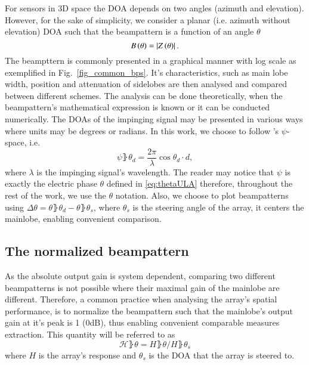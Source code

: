 For sensors in 3D space the DOA depends on two angles (azimuth and elevation).
However, for the sake of simplicity, we consider a planar (i.e. azimuth without elevation) DOA such that the beampattern is a function of an angle $\theta$
\begin{equation}
B\left({\theta}\right) = \left\vert Z\left({\theta}\right)\right\vert.
\end{equation}
The beampttern is commonly presented in a graphical manner with log scale as exemplified in Fig.~\ref{fig_common_bps}.
It's characteristics, such as main lobe width, position and attenuation of sidelobes are then analysed and compared between different schemes.
The analysis can be done theoretically, when the beampattern's mathematical expression is known or it can be conducted numerically.
The DOAs of the impinging signal may be presented in various ways where units may be degrees or radians.
In this work, we choose to follow \cite{van2004optimum}'s $\psi$-space, i.e.
\begin{equation}
    \psi\rBrace{\theta_{d}}=\frac{2\pi}{\lambda}\cos{\theta_{d}}\cdot{}d,
\end{equation}
where $\lambda$ is the impinging signal's wavelength.
The reader may notice that $\psi$ is exactly the electric phase $\theta$ defined in \eqref{eq:thetaULA} therefore, throughout the rest of the work, we use the $\theta$ notation. 
Also, we choose to plot beampatterns using $\Delta\theta = \theta\rBrace{\theta_{d}} - \theta\rBrace{\theta_{s}}$, where $\theta_{s}$ is the steering angle of the array, it centers the mainlobe, enabling convenient comparison.
\subsection{The normalized beampattern}
As the absolute output gain is system dependent, comparing two different beampatterns is not possible where their maximal gain of the mainlobe are different.
Therefore, a common practice \cite{van2004optimum} when analysing the array's spatial performance, is to normalize the beampattern such that the mainlobe's output gain at it's peak is 1 (0dB), thus enabling convenient comparable measures extraction.
This quantity will be referred to as $$\mathcal{H}\rBrace{\theta} = H\rBrace{\theta}/H\rBrace{\theta_{s}}$$ where $H$ is the array's response and $\theta_{s}$ is the DOA that the array is steered to.
